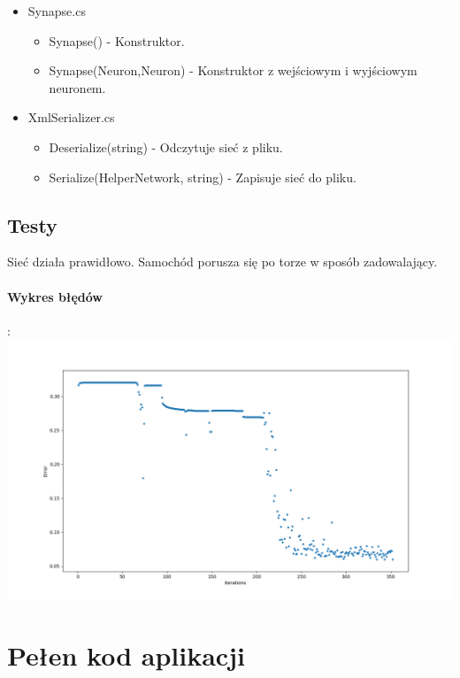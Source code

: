 \documentclass[12pt,a4paper]{article}
\begin{document}
\begin{itemize}
\begin{itemize}
			\end{itemize}
		\item Synapse.cs
			\begin{itemize}
				\item Synapse() - Konstruktor.
				\item Synapse(Neuron,Neuron) - Konstruktor z wejściowym i wyjściowym neuronem.
			\end{itemize}
		\item XmlSerializer.cs
			\begin{itemize}
				\item Deserialize(string) - Odczytuje sieć z pliku.
				\item Serialize(HelperNetwork, string) - Zapisuje sieć do pliku.
			\end{itemize}
	\end{itemize}

	\subsection*{Testy}
	Sieć działa prawidłowo. Samochód porusza się po torze w sposób zadowalający.	\\
	\paragraph{Wykres błędów}:\\
	\includegraphics[scale=0.5]{supa_wykres}
	\newpage
	\section*{Pełen kod aplikacji}
\end{document}
